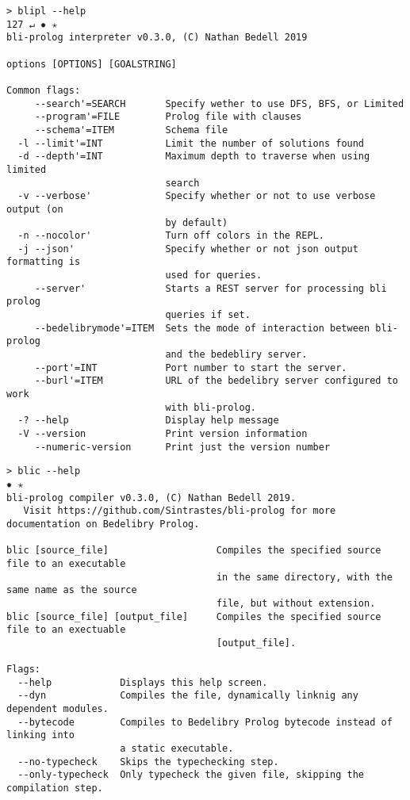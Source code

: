\documentclass{book}
\begin{document}
\begin{verbatim}
> blipl --help                                                                                                                                                                                           127 ↵ ✹ ✭
bli-prolog interpreter v0.3.0, (C) Nathan Bedell 2019

options [OPTIONS] [GOALSTRING]

Common flags:
     --search'=SEARCH       Specify wether to use DFS, BFS, or Limited
     --program'=FILE        Prolog file with clauses
     --schema'=ITEM         Schema file
  -l --limit'=INT           Limit the number of solutions found
  -d --depth'=INT           Maximum depth to traverse when using limited
                            search
  -v --verbose'             Specify whether or not to use verbose output (on
                            by default)
  -n --nocolor'             Turn off colors in the REPL.
  -j --json'                Specify whether or not json output formatting is
                            used for queries.
     --server'              Starts a REST server for processing bli prolog
                            queries if set.
     --bedelibrymode'=ITEM  Sets the mode of interaction between bli-prolog
                            and the bedebliry server.
     --port'=INT            Port number to start the server.
     --burl'=ITEM           URL of the bedelibry server configured to work
                            with bli-prolog.
  -? --help                 Display help message
  -V --version              Print version information
     --numeric-version      Print just the version number
\end{verbatim}

\begin{verbatim}
> blic --help                                                                                                                                                                                                  ✹ ✭
bli-prolog compiler v0.3.0, (C) Nathan Bedell 2019.
   Visit https://github.com/Sintrastes/bli-prolog for more documentation on Bedelibry Prolog.

blic [source_file]                   Compiles the specified source file to an executable
                                     in the same directory, with the same name as the source
                                     file, but without extension.
blic [source_file] [output_file]     Compiles the specified source file to an exectuable
                                     [output_file].

Flags:
  --help            Displays this help screen.
  --dyn             Compiles the file, dynamically linknig any dependent modules.
  --bytecode        Compiles to Bedelibry Prolog bytecode instead of linking into
                    a static executable.
  --no-typecheck    Skips the typechecking step.
  --only-typecheck  Only typecheck the given file, skipping the compilation step.
\end{verbatim}
\end{document}
